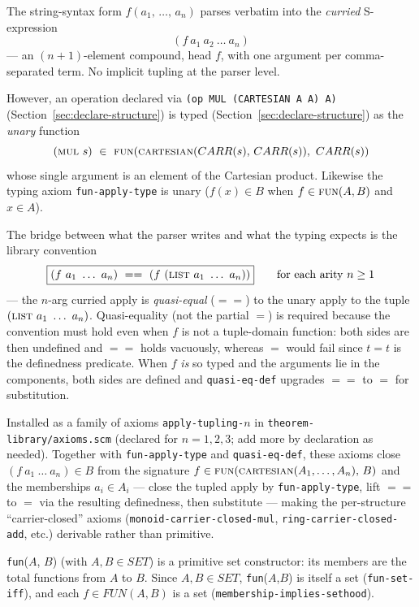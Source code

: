 \begin{remark}
\label{sec:curried-tupled-apply}
The string-syntax form $f(a_1,\,\ldots,\,a_n)$ parses verbatim into the
\emph{curried} S-expression
\[
  (f\ a_1\ a_2\ \ldots\ a_n)
\]
— an $(n+1)$-element compound, head $f$, with one argument per
comma-separated term.  No implicit tupling at the parser level.

However, an operation declared via
\texttt{(op MUL (CARTESIAN A A) A)} (Section~\ref{sec:declare-structure})
is typed (Section~\ref{sec:declare-structure}) as the \emph{unary} function
\[
  (\textsc{mul}\ s)\ \in\ \textsc{fun}(\textsc{cartesian}(CARR(s),\,CARR(s)),\ CARR(s))
\]
whose single argument is an element of the Cartesian product.
Likewise the typing axiom \texttt{fun-apply-type} is unary
($f(x) \in B$ when $f \in \textsc{fun}(A,B)$ and $x \in A$).

The bridge between what the parser writes and what the typing expects
is the library convention
\[
  \boxed{(f\ a_1\ \ldots\ a_n)\ \mathrel{==}\ (f\ (\textsc{list}\ a_1\ \ldots\ a_n))}
  \qquad\text{for each arity } n \geq 1
\]
— the $n$-arg curried apply is \emph{quasi-equal} ($\mathrel{==}$) to
the unary apply to the tuple
$(\textsc{list}\ a_1\ \ldots\ a_n)$.  Quasi-equality (not the partial
$=$) is required because the convention must hold even when $f$ is
not a tuple-domain function: both sides are then undefined and
$\mathrel{==}$ holds vacuously, whereas $=$ would fail since $t=t$
is the definedness predicate.  When $f$ \emph{is} so typed and the
arguments lie in the components, both sides are defined and
\texttt{quasi-eq-def} upgrades $\mathrel{==}$ to $=$ for substitution.

Installed as a family of axioms \texttt{apply-tupling-$n$} in
\texttt{theorem-library/axioms.scm} (declared for $n = 1, 2, 3$;
add more by declaration as needed).  Together with
\texttt{fun-apply-type} and \texttt{quasi-eq-def}, these axioms
close $(f\ a_1\ \ldots\ a_n) \in B$ from the signature
$f \in \textsc{fun}(\textsc{cartesian}(A_1,\ldots,A_n),\,B)$ and the
memberships $a_i \in A_i$ — close the tupled apply by
\texttt{fun-apply-type}, lift $\mathrel{==}$ to $=$ via the
resulting definedness, then substitute — making the per-structure
``carrier-closed'' axioms (\texttt{monoid-carrier-closed-mul},
\texttt{ring-carrier-closed-add}, etc.) derivable rather than
primitive.
\end{remark}

\texttt{fun}($A$, $B$) (with $A, B \in \mathit{SET}$) is a primitive set constructor: its members are
the total functions from $A$ to $B$.  Since $A, B \in \mathit{SET}$,
\texttt{fun}($A$,$B$) is itself a set (\texttt{fun-set-iff}), and each
$f \in \mathit{FUN}(A,B)$ is a set (\texttt{membership-implies-sethood}).

